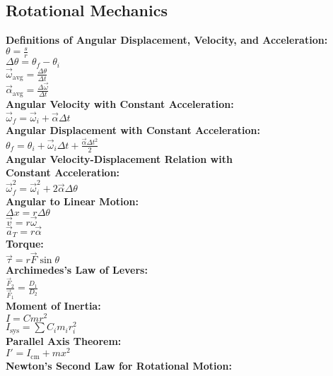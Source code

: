 \documentclass[12pt]{article}
\begin{document}
\subsection*{Rotational Mechanics}
\textbf{Definitions of Angular Displacement, Velocity, and Acceleration:}
    \\ \( \theta = \displaystyle\frac{ s }{ r } \)
    \\ \( \Delta \theta = \theta_f - \theta_i \)
    \\ \( \vec { \omega }_{\text{avg}} = \displaystyle\frac{ \Delta \theta }{ \Delta t } \)
    \\ \( \vec { \alpha }_{\text{avg}} = \displaystyle\frac{ \Delta \vec { \omega } }{ \Delta t } \)
\\ \textbf{Angular Velocity with Constant Acceleration:}
    \\ \( \vec{ \omega }_f = \vec{ \omega }_i + \vec{ \alpha } \Delta t \)
\\ \textbf{Angular Displacement with Constant Acceleration:}
    \\ \( \theta_f = \theta_i + \vec{ \omega }_i \Delta t + \displaystyle\frac{ \vec{ \alpha } \Delta t^2 }{ 2 } \)
\\ \textbf{Angular Velocity-Displacement Relation with \\ Constant Acceleration:}
    \\ \( \vec{ \omega }_{f}^2 = \vec{ \omega }_{i}^2 + 2 \vec{ \alpha } \Delta \theta \)
\\ \textbf{Angular to Linear Motion:}
    \\ \( \Delta x = r \Delta \theta \)
    \\ \( \vec{ v } = r \vec{ \omega } \)
    \\ \( \vec{ a }_T = r \vec{ \alpha } \)
\\ \textbf{Torque:}
    \\ \( \vec{ \tau } = r \vec{ F } \sin \theta \)
\\ \textbf{Archimedes's Law of Levers:}
    \\ \( \displaystyle\frac{ \vec{ F }_2 }{ \vec{ F }_1 } = \displaystyle\frac{ D_1 }{ D_2 } \)
\\ \textbf{Moment of Inertia:}
    \\ \( I = Cmr^2 \)
    \\ \( I_{\text{sys}} = \displaystyle\sum{ C_i m_i r_i^2 } \)
\\ \textbf{Parallel Axis Theorem:}
    \\ \( I' = I_{\text{cm}} + mx^2 \)
\\ \textbf{Newton's Second Law for Rotational Motion:}
\end{document}
